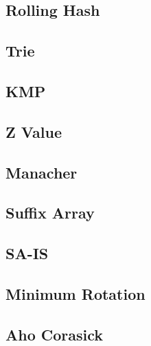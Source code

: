 \documentclass[a4paper,10pt,twocolumn,oneside]{article}
\begin{document}
\subsection{Rolling Hash}


\subsection{Trie}


\subsection{KMP}


\subsection{Z Value}


\subsection{Manacher}


% 

\subsection{Suffix Array}


\subsection{SA-IS}


\subsection{Minimum Rotation}


\subsection{Aho Corasick}

\end{document}
